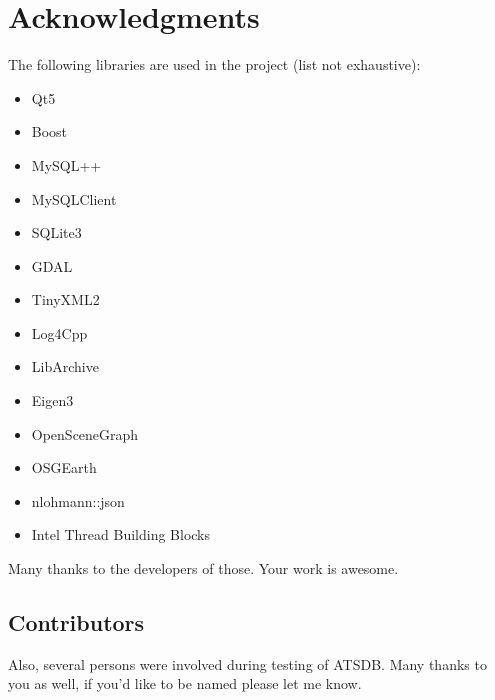 \section{Acknowledgments}

The following libraries are used in the project (list not exhaustive):

\begin{itemize}  
\item Qt5
\item Boost
\item MySQL++
\item MySQLClient
\item SQLite3
\item GDAL
\item TinyXML2
\item Log4Cpp
\item LibArchive
\item Eigen3
\item OpenSceneGraph
\item OSGEarth
\item nlohmann::json
\item Intel Thread Building Blocks
\end{itemize}

Many thanks to the developers of those. Your work is awesome.

\subsection{Contributors}

Also, several persons were involved during testing of ATSDB. Many thanks to you as well, if you'd like to be named please let me know.



